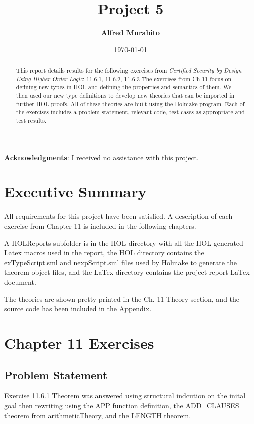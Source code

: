 \documentclass[11pt, twoside]{article}
\title{Project 5}
\author{\textbf{Alfred Murabito}}
\date{\today}
\begin{document}
\maketitle{}

\newpage

\begin{abstract}
   \noindent{}This report details results for the following exercises
from \textit{Certified Security by Design Using Higher Order Logic}:
11.6.1, 11.6.2, 11.6.3 The exercises from Ch 11 focus on defining new
types in HOL and defining the properties and semantics of them. We
then used our new type definitions to develop new theories that can be
imported in further HOL proofs. All of these theories are built using
the Holmake program. Each of the exercises includes a problem
statement, relevant code, test cases as appropriate and test results. 
\end{abstract}

\newpage

\textbf{Acknowledgments}: I received no assistance with this project.

\newpage

\tableofcontents

\newpage

\section{Executive Summary}
\label{sec:executive-summary}

All requirements for this project have been satisfied.  A description of each exercise from Chapter 11 is included in the following chapters.  

A HOLReports subfolder is in the HOL directory with all the HOL generated Latex macros used in the report, the HOL directory contains the exTypeScript.sml and
nexpScript.sml files used by Holmake to generate the theorem object files, and the LaTex directory contains the project report LaTex document.

The theories are shown pretty printed in the Ch. 11 Theory section, and the source code has been included in the Appendix.
\newpage


\section{Chapter 11 Exercises}
\label{sec:chapter-11-exercises}

\subsection{Problem Statement}
\label{sec:problem-statement}
Exercise 11.6.1 Theorem was answered using structural indcution on the inital goal then rewriting
using the APP function definition, the ADD_CLAUSES theorem from arithmeticTheory, and the LENGTH theorem.
\end{document}
